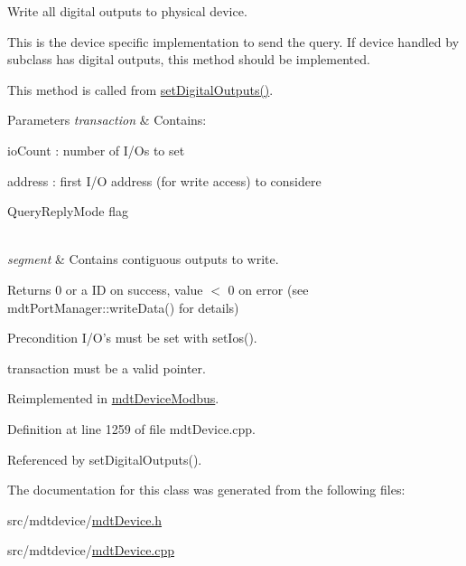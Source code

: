 Write all digital outputs to physical device. 

This is the device specific implementation to send the query. If device handled by subclass has digital outputs, this method should be implemented.

This method is called from \hyperlink{classmdt_device_a7b86a816e55a91f0d62426e1741437c6}{set\-Digital\-Outputs()}.


\begin{DoxyParams}{Parameters}
{\em transaction} & Contains\-:
\begin{DoxyItemize}
\item io\-Count \-: number of I/\-Os to set
\item address \-: first I/\-O address (for write access) to considere
\item Query\-Reply\-Mode flag 
\end{DoxyItemize}\\
\hline
{\em segment} & Contains contiguous outputs to write. \\
\hline
\end{DoxyParams}
\begin{DoxyReturn}{Returns}
0 or a I\-D on success, value $<$ 0 on error (see mdt\-Port\-Manager\-::write\-Data() for details) 
\end{DoxyReturn}
\begin{DoxyPrecond}{Precondition}
I/\-O's must be set with set\-Ios(). 

transaction must be a valid pointer. 
\end{DoxyPrecond}


Reimplemented in \hyperlink{classmdt_device_modbus_a6713edaee0bfba48791008124299b753}{mdt\-Device\-Modbus}.



Definition at line 1259 of file mdt\-Device.\-cpp.



Referenced by set\-Digital\-Outputs().



The documentation for this class was generated from the following files\-:\begin{DoxyCompactItemize}
\item 
src/mdtdevice/\hyperlink{mdt_device_8h}{mdt\-Device.\-h}\item 
src/mdtdevice/\hyperlink{mdt_device_8cpp}{mdt\-Device.\-cpp}\end{DoxyCompactItemize}
